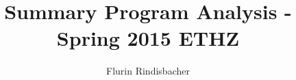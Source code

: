 \documentclass[10pt,a4paper]{report}
\begin{document}
\title{Summary Program Analysis - Spring 2015 ETHZ}
\author{Flurin Rindisbacher}

\maketitle

\tableofcontents

 


\end{document}
